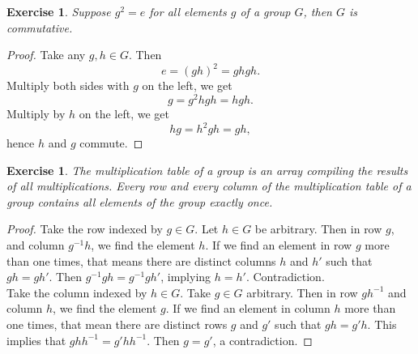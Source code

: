 \documentclass[a4paper, 11pt]{book}
\theoremstyle{plain}
\newtheorem{exercise}[theorem]{Exercise}
\theoremstyle{plain}
\begin{document}
\begin{exercise}
Suppose $g^2=e$ for all elements $g$ of a group $G$, then $G$ is commutative.
\end{exercise}
\begin{proof}
Take any $g,h\in G$. Then
$$e=(gh)^2 = ghgh.$$
Multiply both sides with $g$ on the left, we get
$$g = g^2hgh = hgh.$$
Multiply by $h$ on the left, we get
$$hg = h^2gh = gh,$$
hence $h$ and $g$ commute.
\end{proof}

\begin{exercise}
The multiplication table of a group is an array compiling the results of all multiplications. Every row and every column of the multiplication table of a group contains all elements of the group exactly once.
\end{exercise}
\begin{proof}
Take the row indexed by $g\in G$. Let $h\in G$ be arbitrary. Then in row $g$, and column $g^{-1}h$, we find the element $h$. If we find an element in row $g$ more than one times, that means there are distinct columns $h$ and $h'$ such that $gh=gh'$. Then $g^{-1}gh = g^{-1}gh'$, implying $h=h'$. Contradiction.\\

Take the column indexed by $h\in G$. Take $g\in G$ arbitrary. Then in row $gh^{-1}$ and column $h$, we find the element $g$. If we find an element in column $h$ more than one times, that mean there are distinct rows $g$ and $g'$ such that $gh=g'h$. This implies that $ghh^{-1} = g'hh^{-1}$. Then $g=g'$, a contradiction.
\end{proof}
\end{document}
